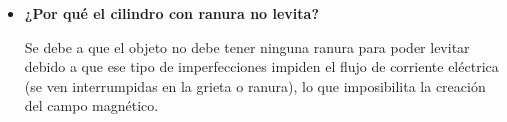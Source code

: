 \documentclass[letterpaper, 12pt]{report}
\begin{document}
\begin{itemize}
      \item \textbf{¿Por qué el cilindro con ranura no levita?}

            Se debe a que el objeto no debe tener ninguna ranura para
            poder levitar debido a que ese tipo de imperfecciones
            impiden el flujo de corriente eléctrica (se ven
            interrumpidas en la grieta o ranura), lo que imposibilita
            la creación del campo magnético.
\end{itemize}

\newpage

\printbibliography
\end{document}
